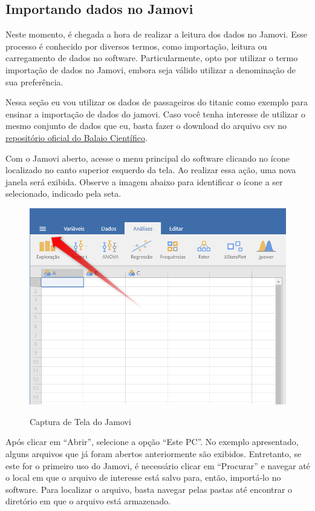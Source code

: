 \subsection{Importando dados no Jamovi}

Neste momento, é chegada a hora de realizar a leitura dos dados no Jamovi. Esse processo é conhecido por diversos termos, como importação, leitura ou carregamento de dados no software. Particularmente, opto por utilizar o termo importação de dados no Jamovi, embora seja válido utilizar a denominação de sua preferência.

Nessa seção eu vou utilizar os dados de passageiros do titanic como exemplo para ensinar a importação de dados do jamovi. Caso você tenha interesse de utilizar o mesmo conjunto de dados que eu, basta fazer o download do arquivo csv no \href{https://github.com/balaio-cientifico/dataset}{repositório oficial do Balaio Científico}.

Com o Jamovi aberto, acesse o menu principal do software clicando no ícone localizado no canto superior esquerdo da tela. Ao realizar essa ação, uma nova janela será exibida. Observe a imagem abaixo para identificar o ícone a ser selecionado, indicado pela seta.

\begin{figure}[H]
  \centering
  \caption{Captura de Tela do Jamovi}
  \includegraphics[width=\textwidth]{imagens/cap_1/importa_dados_1.png}
  \label{fig:importa_dados_1}
\end{figure}

Após clicar em “Abrir”, selecione a opção “Este PC”. No exemplo apresentado, alguns arquivos que já foram abertos anteriormente são exibidos. Entretanto, se este for o primeiro uso do Jamovi, é necessário clicar em “Procurar” e navegar até o local em que o arquivo de interesse está salvo para, então, importá-lo no software. Para localizar o arquivo, basta navegar pelas pastas até encontrar o diretório em que o arquivo está armazenado.

